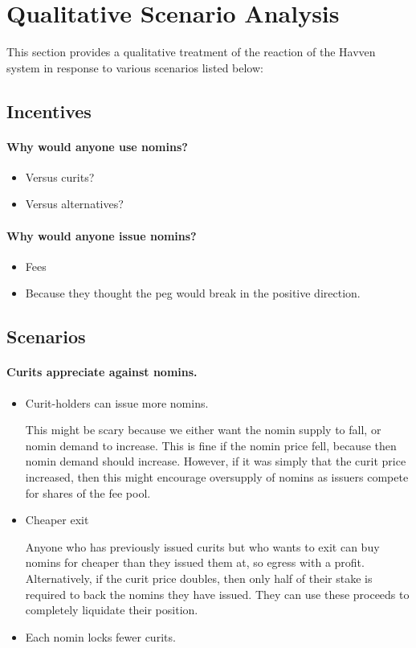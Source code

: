 
\section{Qualitative Scenario Analysis}

This section provides a qualitative treatment of the reaction of the Havven system in response to various scenarios listed below:


\subsection{Incentives}

\paragraph{Why would anyone use nomins?}
\begin{itemize}
	\item Versus curits?
	\item Versus alternatives?
\end{itemize}

\paragraph{Why would anyone issue nomins?}
\begin{itemize}
	\item Fees
	\item Because they thought the peg would break in the positive direction.
\end{itemize}

\subsection{Scenarios}

\paragraph{Curits appreciate against nomins.}
\begin{itemize}
	\item{Curit-holders can issue more nomins.}

	This might be scary because we either want the nomin supply to fall, or nomin demand to increase.
	This is fine if the nomin price fell, because then nomin demand should increase.
	However, if it was simply that the curit price increased, then this might encourage
	oversupply of nomins as issuers compete for shares of the fee pool.

	\item{Cheaper exit}

	Anyone who has previously issued curits but who wants to exit can buy nomins for
	cheaper than they issued them at, so egress with a profit.
	Alternatively, if the curit price doubles, then only half of their stake is required
	to back the nomins they have issued. They can use these proceeds to completely liquidate
	their position.

	\item{Each nomin locks fewer curits.}
	
\end{itemize}

